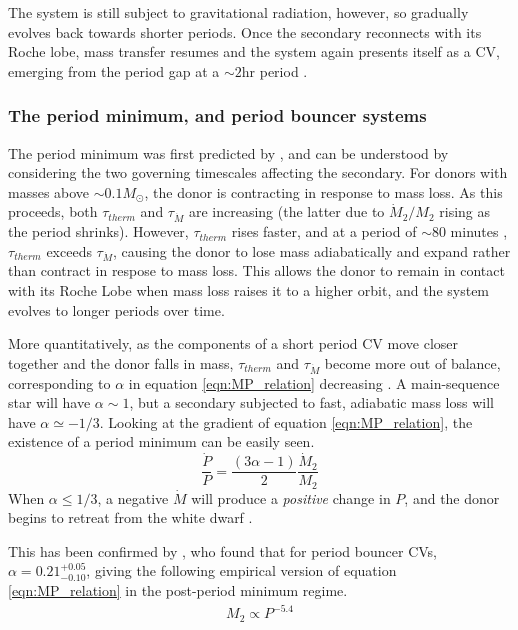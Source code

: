 The system is still subject to gravitational radiation, however, so gradually evolves back towards shorter periods. Once the secondary reconnects with its Roche lobe, mass transfer resumes and the system again presents itself as a CV, emerging from the period gap at a $\sim2$hr period \citep{kolb2002}.

\subsubsection{The period minimum, and period bouncer systems}
\label{sect:introduction:period minimum and bouncers}

The period minimum was first predicted by \citet{rappaport1982}, and can be understood by considering the two governing timescales affecting the secondary. 
For donors with masses above $\sim0.1 M_{\odot}$, the donor is contracting in response to mass loss. 
As this proceeds, both $\tau_{therm}$ and $\tau_{\dot M}$ are increasing (the latter due to $\dot M_2 / M_2$ rising as the period shrinks). However, $\tau_{therm}$ rises faster, and at a period of $\sim80$ minutes \citep{ritter1998, McAllister2019}, $\tau_{therm}$ exceeds $\tau_{\dot M}$, causing the donor to lose mass adiabatically and expand rather than contract in respose to mass loss.
This allows the donor to remain in contact with its Roche Lobe when mass loss raises it to a higher orbit, and the system evolves to longer periods over time.

More quantitatively, as the components of a short period CV move closer together and the donor falls in mass, $\tau_{therm}$ and $\tau_{\dot M}$ become more out of balance, corresponding to $\alpha$ in equation \ref{eqn:MP_relation} decreasing \citep{Knigge2011b}. A main-sequence star will have $\alpha \sim 1$, but a secondary subjected to fast, adiabatic mass loss will have $\alpha \simeq -1/3$. Looking at the gradient of equation \ref{eqn:MP_relation}, the existence of a period minimum can be easily seen.
\begin{equation}
    \frac{\dot P}{P} = \frac{(3\alpha - 1)}{2} \frac{\dot M_2}{M_2}
\end{equation}
When $\alpha \le 1/3$, a negative $\dot M$ will produce a \textit{positive} change in $P$, and the donor begins to retreat from the white dwarf \citep{rezzolla2001}. 

This has been confirmed by \citet{knigge11}, who found that for period bouncer CVs, $\alpha = 0.21^{+0.05}_{-0.10}$, giving the following empirical version of equation \ref{eqn:MP_relation} in the post-period minimum regime.
\begin{align}
    M_2 \propto P^{-5.4}
\end{align}


